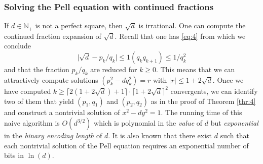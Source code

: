 \documentclass[a4paper,11pt,american]{article}
\newcommand{\N}{\mathbb{N}}
\theoremstyle{plain}
\theoremstyle{definition}
\begin{document}
  \subsubsection*{Solving the Pell equation with continued fractions}


  If $d \in \N_+$ is not a perfect square, then $\sqrt{d}$ is irrational. One can compute the continued fraction expansion of $\sqrt{d}$. Recall that one has  \eqref{eq:4} from which we conclude
  \begin{displaymath}
    \vert  \sqrt{d} - p_k / q_k \vert  \leq 1 (q_k q_{k+1}) \leq 1/ q_k^2 
  \end{displaymath}
  and that the fraction $p_k/q_k$ are reduced for $k\geq0$. This means that we can attractively compute solutions $(p_k^2 - d q_k^2) = r$ with $\vert r\vert  \leq 1 + 2 \sqrt{d}$. Once we have computed  $k \geq\lceil  2( 1  + 2\sqrt{d} ) +1 \rceil   \cdot \lceil 1 + 2 \sqrt{d}\rceil ^2 $ convergents,  we can identify two of them that yield $(p_1,q_1)$ and $(p_2,q_2)$ as in the proof of Theorem \eqref{thr:4} and construct a nontrivial solution of $x^2 - d y^2 = 1$. The running time of this naive algorithm is $O(d^{3/2})$  which is polynomial in the \emph{value } of  $d$ but \emph{exponential} in the \emph{binary encoding length} of $d$. It is also known that there exist $d$ such that each nontrivial solution of the Pell equation requires an exponential number of bits in $\ln (d)$. %
\end{document}

